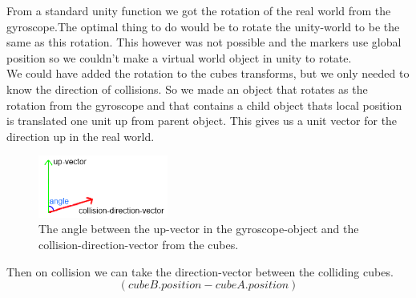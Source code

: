 From a standard unity function we got the rotation of the real world from the gyroscope.The optimal thing to do would be to rotate the unity-world to be the same as this rotation. This however was not possible and the markers use global position so we couldn't make a virtual world object in unity to rotate.\\
We could have added the rotation to the cubes transforms, but we only needed to know the direction of collisions. So we made an object that rotates as the rotation from the gyroscope and that contains a child object thats local position is translated one unit up from parent object. This gives us a unit vector for the direction up in the real world.
\\

\begin{figure}
        \capstart
        \centering
        \vspace{-10pt}
        \includegraphics[width=0.38\textwidth]{images/CollisionDirectionAngleModel.png}
        \vspace{-10pt}
        \caption[Model for finding the angle between the vectors]{The angle between the up-vector in the gyroscope-object and the collision-direction-vector from the cubes.}
        \vspace{-10pt}
        \label{fig:Vector_Angle_model}
\end{figure}


Then on collision we can take the direction-vector between the colliding cubes. 
\[
(cubeB.position - cubeA.position)
\]


